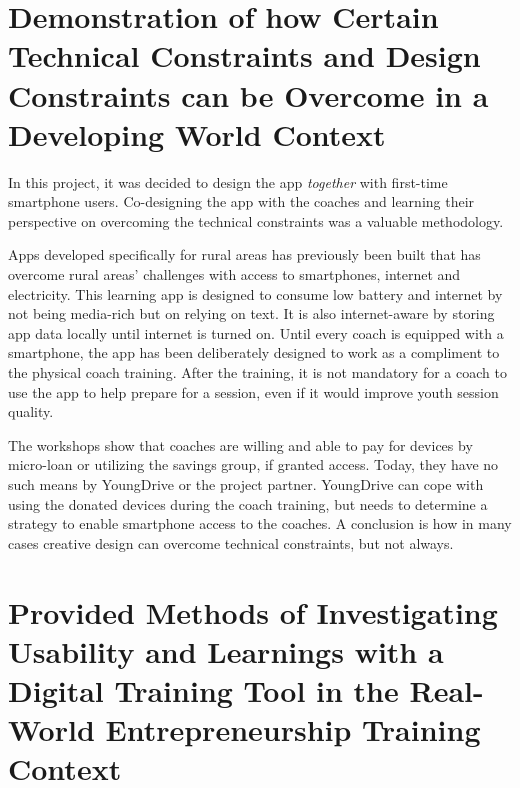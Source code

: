 \section{Demonstration of how Certain Technical Constraints and Design Constraints can be Overcome in a Developing World Context} %

In this project, it was decided to design the app \textit{together} with first-time smartphone users. Co-designing the app with the coaches and learning their perspective on overcoming the technical constraints was a valuable methodology.

Apps developed specifically for rural areas has previously been built that has overcome rural areas’ challenges with access to smartphones, internet and electricity. This learning app is designed to consume low battery and internet by not being media-rich but on relying on text. It is also internet-aware by storing app data locally until internet is turned on. Until every coach is equipped with a smartphone, the app has been deliberately designed to work as a compliment to the physical coach training. After the training, it is not mandatory for a coach to use the app to help prepare for a session, even if it would improve youth session quality.

The workshops show that coaches are willing and able to pay for devices by micro-loan or utilizing the savings group, if granted access. Today, they have no such means by YoungDrive or the project partner. YoungDrive can cope with using the donated devices during the coach training, but needs to determine a strategy to enable smartphone access to the coaches. A conclusion is how in many cases creative design can overcome technical constraints, but not always.


\section{Provided Methods of Investigating Usability and Learnings with a Digital Training Tool in the Real-World Entrepreneurship Training Context} %

